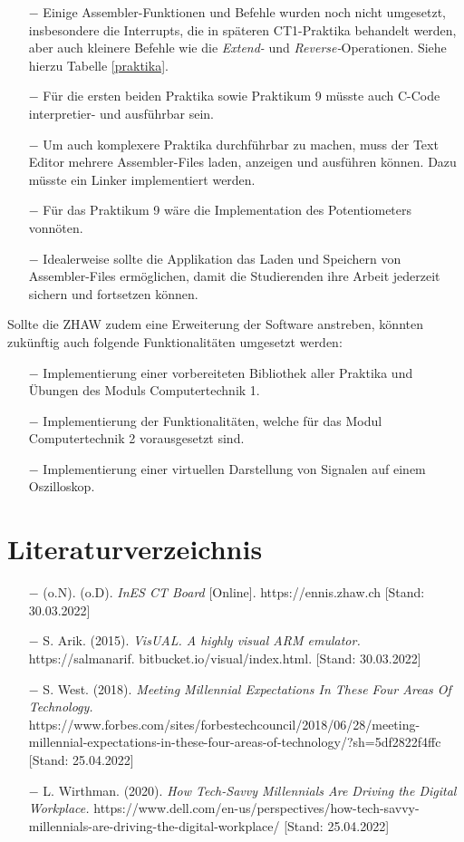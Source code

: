 \documentclass[10pt]{article}
\begin{document}
\begin{itemize}
	\item[$-$] Einige Assembler-Funktionen und Befehle wurden noch nicht umgesetzt, insbesondere die Interrupts, die in späteren CT1-Praktika behandelt werden, aber auch kleinere Befehle wie die \emph{Extend-} und \emph{Reverse-}Operationen. Siehe hierzu Tabelle \ref{praktika}.
	\item[$-$] Für die ersten beiden Praktika sowie Praktikum 9 müsste auch C-Code interpretier- und ausführbar sein.
	\item[$-$] Um auch komplexere Praktika durchführbar zu machen, muss der Text Editor mehrere Assembler-Files laden, anzeigen und ausführen können. Dazu müsste ein Linker implementiert werden.
	\item[$-$] Für das Praktikum 9 wäre die Implementation des Potentiometers vonnöten.
	\item[$-$] Idealerweise sollte die Applikation das Laden und Speichern von Assembler-Files ermöglichen, damit die Studierenden ihre Arbeit jederzeit sichern und fortsetzen können.


\end{itemize}


Sollte die ZHAW zudem eine Erweiterung der Software anstreben, könnten zukünftig auch folgende Funktionalitäten umgesetzt werden: 
\begin{itemize}
\item[$-$] Implementierung einer vorbereiteten Bibliothek aller Praktika und Übungen des Moduls \glqq Computertechnik 1\grqq. 
\item[$-$] Implementierung der Funktionalitäten, welche für das Modul \glqq Computertechnik 2\grqq{} vorausgesetzt sind. 
\item[$-$] Implementierung einer virtuellen Darstellung von Signalen auf einem Oszilloskop.
\end{itemize}

\section{Literaturverzeichnis}

\begin{itemize}

\item[$-$] (o.N). (o.D). \emph{InES CT Board} [Online]. https://ennis.zhaw.ch [Stand: 30.03.2022]
\item[$-$] S. Arik. (2015). \emph{VisUAL. A highly visual ARM emulator.} https://salmanarif. bitbucket.io/visual/index.html. [Stand: 30.03.2022]
\item[$-$] S. West. (2018). \emph{Meeting Millennial Expectations In These Four Areas Of Technology.} https://www.forbes.com/sites/forbestechcouncil/2018/06/28/meeting-millennial-expectations-in-these-four-areas-of-technology/?sh=5df2822f4ffc [Stand: 25.04.2022]
\item[$-$] L. Wirthman. (2020). \emph{How Tech-Savvy Millennials Are Driving the Digital Workplace.} https://www.dell.com/en-us/perspectives/how-tech-savvy-millennials-are-driving-the-digital-workplace/ [Stand: 25.04.2022]

\end{itemize}
\end{document}
